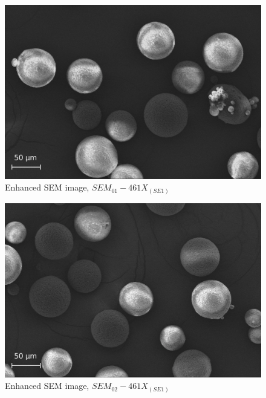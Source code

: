 \documentclass{article}
\begin{document}
          \begin{figure}[h!]
              \centering 
              \includegraphics[width=\textwidth]{Pictures/SEM/Edited/04_01.eps}
              \caption{Enhanced SEM image, $SEM_{01}-461X_{(SE1)}$ \autocites{Pixelmator_Pro}{GIMP}}
              \label{fig:SEM_01}
          \end{figure}

          \begin{figure}[h!]
              \centering 
              \includegraphics[width=\textwidth]{Pictures/SEM/Edited/04_02.eps}
              \caption{Enhanced SEM image, $SEM_{02}-461X_{(SE1)}$ \autocites{Pixelmator_Pro}{GIMP}}
              \label{fig:SEM_02}
          \end{figure}
\end{document}
